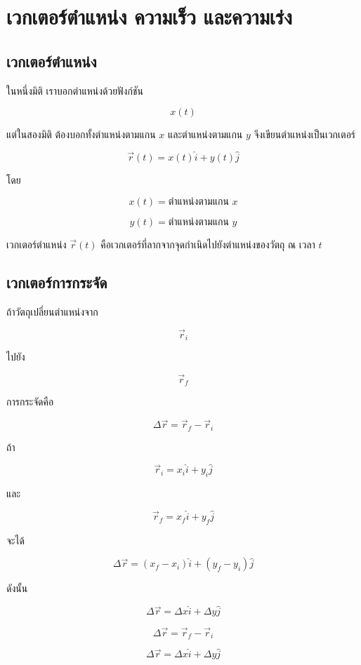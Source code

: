 \newpage{}

\section{เวกเตอร์ตำแหน่ง ความเร็ว และความเร่ง}

\subsection{เวกเตอร์ตำแหน่ง}

ในหนึ่งมิติ เราบอกตำแหน่งด้วยฟังก์ชัน

\[
x(t)
\]

แต่ในสองมิติ ต้องบอกทั้งตำแหน่งตามแกน $x$ และตำแหน่งตามแกน $y$ จึงเขียนตำแหน่งเป็นเวกเตอร์

\[
\vec{r}(t)=x(t)\hat{i}+y(t)\hat{j}
\]

โดย

\[
x(t)=\text{ตำแหน่งตามแกน }x
\]

\[
y(t)=\text{ตำแหน่งตามแกน }y
\]

\begin{tcolorbox}[title=นิยาม]
เวกเตอร์ตำแหน่ง $\vec{r}(t)$ คือเวกเตอร์ที่ลากจากจุดกำเนิดไปยังตำแหน่งของวัตถุ ณ เวลา $t$
\end{tcolorbox}

\subsection{เวกเตอร์การกระจัด}

ถ้าวัตถุเปลี่ยนตำแหน่งจาก

\[
\vec{r}_i
\]

ไปยัง

\[
\vec{r}_f
\]

การกระจัดคือ

\[
\Delta \vec{r}=\vec{r}_f-\vec{r}_i
\]

ถ้า

\[
\vec{r}_i=x_i\hat{i}+y_i\hat{j}
\]

และ

\[
\vec{r}_f=x_f\hat{i}+y_f\hat{j}
\]

จะได้

\[
\Delta \vec{r}
=
(x_f-x_i)\hat{i}+(y_f-y_i)\hat{j}
\]

ดังนั้น

\[
\Delta \vec{r}=\Delta x\hat{i}+\Delta y\hat{j}
\]

\begin{tcolorbox}[title=สรุป]
\[
\Delta \vec{r}=\vec{r}_f-\vec{r}_i
\]

\[
\Delta \vec{r}=\Delta x\hat{i}+\Delta y\hat{j}
\]
\end{tcolorbox}

